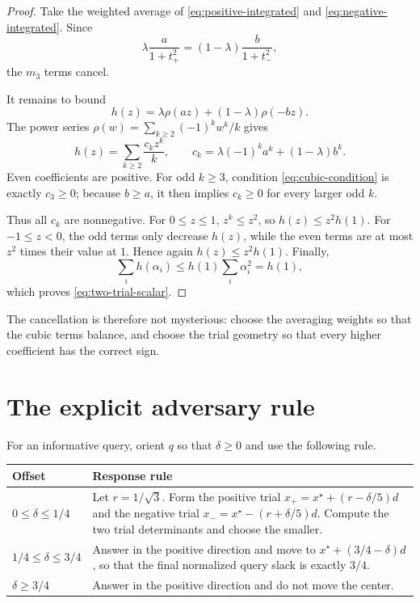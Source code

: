 \documentclass[11pt]{article}
\theoremstyle{definition}
\newcommand{\1}{\mathbf{1}}
\begin{document}
\begin{proof}
Take the weighted average of \eqref{eq:positive-integrated} and \eqref{eq:negative-integrated}.  Since
\[
\lambda\frac{a}{1+t_+^2}
=(1-\lambda)\frac{b}{1+t_-^2},
\]
the $m_3$ terms cancel.

It remains to bound
\[
h(z)=\lambda\rho(az)+(1-\lambda)\rho(-bz).
\]
The power series $\rho(w)=\sum_{k\ge2}(-1)^kw^k/k$ gives
\[
h(z)=\sum_{k\ge2}\frac{c_kz^k}{k},
\qquad
c_k=\lambda(-1)^ka^k+(1-\lambda)b^k.
\]
Even coefficients are positive.  For odd $k\ge3$, condition \eqref{eq:cubic-condition} is exactly $c_3\ge0$; because $b\ge a$, it then implies $c_k\ge0$ for every larger odd $k$.

Thus all $c_k$ are nonnegative.  For $0\le z\le1$, $z^k\le z^2$, so $h(z)\le z^2h(1)$.  For $-1\le z<0$, the odd terms only decrease $h(z)$, while the even terms are at most $z^2$ times their value at $1$.  Hence again $h(z)\le z^2h(1)$.  Finally,
\[
\sum_i h(\alpha_i)\le h(1)\sum_i\alpha_i^2=h(1),
\]
which proves \eqref{eq:two-trial-scalar}.
\end{proof}

The cancellation is therefore not mysterious: choose the averaging weights so that the cubic terms balance, and choose the trial geometry so that every higher coefficient has the correct sign.

\section{The explicit adversary rule}

For an informative query, orient $q$ so that $\delta\ge0$ and use the following rule.

\begin{center}
\begin{tabular}{>{\raggedright\arraybackslash}p{} >{\raggedright\arraybackslash}p{}}
\toprule
Offset & Response rule \\
\midrule
$0\le\delta\le1/4$
& Let $r=1/\sqrt3$.  Form the positive trial
$x_+=x^\star+(r-\delta/5)d$
and the negative trial
$x_-=x^\star-(r+\delta/5)d$.
Compute the two trial determinants and choose the smaller.\\[0.4em]
$1/4\le\delta\le3/4$
& Answer in the positive direction and move to
$x^\star+(3/4-\delta)d$, so that the final normalized query slack is exactly $3/4$.\\[0.4em]
$\delta\ge3/4$
& Answer in the positive direction and do not move the center.\\
\bottomrule
\end{tabular}
\end{center}
\end{document}
